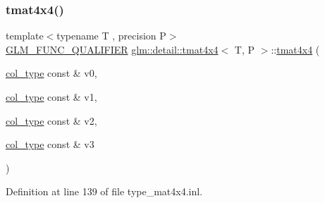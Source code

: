 \subsubsection{\texorpdfstring{tmat4x4()}{tmat4x4()}\hspace{0.1cm}{\footnotesize\ttfamily [7/22]}}
{\footnotesize\ttfamily template$<$typename T , precision P$>$ \\
\hyperlink{setup_8hpp_a33fdea6f91c5f834105f7415e2a64407}{G\+L\+M\+\_\+\+F\+U\+N\+C\+\_\+\+Q\+U\+A\+L\+I\+F\+I\+ER} \hyperlink{structglm_1_1detail_1_1tmat4x4}{glm\+::detail\+::tmat4x4}$<$ T, P $>$\+::\hyperlink{structglm_1_1detail_1_1tmat4x4}{tmat4x4} (\begin{DoxyParamCaption}\item[{\hyperlink{structglm_1_1detail_1_1tmat4x4_ade9e794ddd9c2758005f29ddb84e320f}{col\+\_\+type} const \&}]{v0,  }\item[{\hyperlink{structglm_1_1detail_1_1tmat4x4_ade9e794ddd9c2758005f29ddb84e320f}{col\+\_\+type} const \&}]{v1,  }\item[{\hyperlink{structglm_1_1detail_1_1tmat4x4_ade9e794ddd9c2758005f29ddb84e320f}{col\+\_\+type} const \&}]{v2,  }\item[{\hyperlink{structglm_1_1detail_1_1tmat4x4_ade9e794ddd9c2758005f29ddb84e320f}{col\+\_\+type} const \&}]{v3 }\end{DoxyParamCaption})}



Definition at line 139 of file type\+\_\+mat4x4.\+inl.

\mbox{\label{structglm_1_1detail_1_1tmat4x4_afe1431c016d4a0261e597d4c4794d45c}} 
